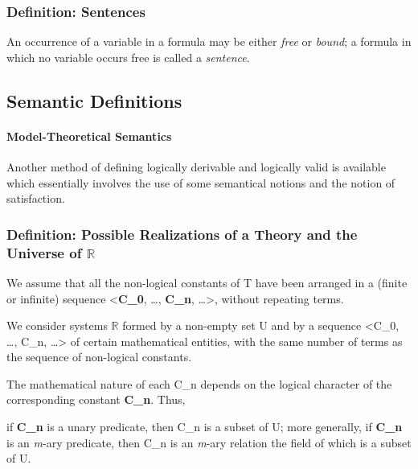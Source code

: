 \hypertarget{definition-sentences}{%
\subsubsection{Definition: Sentences}\label{definition-sentences}}

An occurrence of a variable in a formula may be either \emph{free} or
\emph{bound}; a formula in which no variable occurs free is called a
\emph{sentence}.

\hypertarget{semantic-definitions}{%
\subsection{Semantic Definitions}\label{semantic-definitions}}

\hypertarget{model-theoretical-semantics}{%
\paragraph{Model-Theoretical
Semantics}\label{model-theoretical-semantics}}

Another method of defining logically derivable and logically valid is
available which essentially involves the use of some semantical notions
and the notion of satisfaction.

\hypertarget{definition-possible-realizations-of-a-theory-and-the-universe-of-ux1d57d}{%
\subsubsection{Definition: Possible Realizations of a Theory and the
Universe of
$\mathbb{R}$ }\label{definition-possible-realizations-of-a-theory-and-the-universe-of-ux1d57d}}

We assume that all the non-logical constants of T have been arranged in
a (finite or infinite) sequence \textless{}\textbf{C\_0}, \ldots,
\textbf{C\_n}, \ldots\textgreater, without repeating terms.

We consider systems $\mathbb{R}$  formed by a non-empty set U and by a sequence
\textless C\_0, \ldots, C\_n, \ldots\textgreater{} of certain
mathematical entities, with the same number of terms as the sequence of
non-logical constants.

The mathematical nature of each C\_n depends on the logical character of
the corresponding constant \textbf{C\_n}. Thus,

if \textbf{C\_n} is a unary predicate, then C\_n is a subset of U; more
generally, if \textbf{C\_n} is an \emph{m}-ary predicate, then C\_n is
an \emph{m}-ary relation the field of which is a subset of U.

